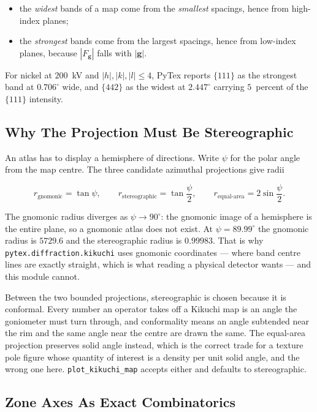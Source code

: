 \begin{itemize}
  \item the \emph{widest} bands of a map come from the \emph{smallest} spacings,
        hence from high-index planes;
  \item the \emph{strongest} bands come from the largest spacings, hence from
        low-index planes, because $|F_{\mathbf{g}}|$ falls with $|\mathbf{g}|$.
\end{itemize}

For nickel at $200$~kV and $|h|,|k|,|l| \le 4$, PyTex reports $\{111\}$ as the
strongest band at $0.706^\circ$ wide, and $\{442\}$ as the widest at
$2.447^\circ$ carrying $5$~percent of the $\{111\}$ intensity.

\subsection{Why The Projection Must Be Stereographic}

An atlas has to display a hemisphere of directions. Write $\psi$ for the polar
angle from the map centre. The three candidate azimuthal projections give radii

\[
  r_{\text{gnomonic}} = \tan\psi, \qquad
  r_{\text{stereographic}} = \tan\frac{\psi}{2}, \qquad
  r_{\text{equal-area}} = 2\sin\frac{\psi}{2}.
\]

The gnomonic radius diverges as $\psi \to 90^\circ$: the gnomonic image of a
hemisphere is the entire plane, so a gnomonic atlas does not exist. At
$\psi = 89.99^\circ$ the gnomonic radius is $5729.6$ and the stereographic radius
is $0.99983$. That is why \texttt{pytex.diffraction.kikuchi} uses gnomonic
coordinates --- where band centre lines are exactly straight, which is what reading
a physical detector wants --- and this module cannot.

Between the two bounded projections, stereographic is chosen because it is
conformal. Every number an operator takes off a Kikuchi map is an angle the
goniometer must turn through, and conformality means an angle subtended near the
rim and the same angle near the centre are drawn the same. The equal-area
projection preserves solid angle instead, which is the correct trade for a texture
pole figure whose quantity of interest is a density per unit solid angle, and the
wrong one here. \texttt{plot\_kikuchi\_map} accepts either and defaults to
stereographic.

\subsection{Zone Axes As Exact Combinatorics}

